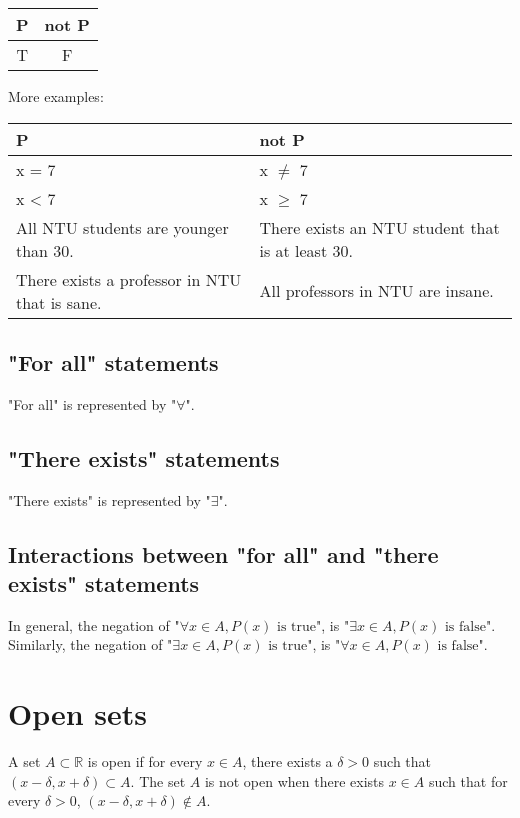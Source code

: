 \documentclass[11pt]{article}
\begin{document}
\begin{center}
\begin{tabular}{ |c|c| }
\hline
P & not P \\
\hline
T & F \\
\hline
\end{tabular}
\end{center}




More examples:

\begin{flushleft}
\begin{tabular}{ | m{15em} | m{15em} | }
\hline
P & not P \\
\hline
x = 7 & x $\neq$ 7 \\
\hline
x < 7 & x $\ge$ 7 \\
\hline
All NTU students are younger than 30. & There exists an NTU student that is at least 30. \\
\hline
There exists a professor in NTU that is sane. & All professors in NTU are insane. \\
\hline
\end{tabular}
\end{flushleft}

\subsection{"For all" statements}
\label{sec:orgfbca6e2}
"For all" is represented by "\(\forall\)".

\subsection{"There exists" statements}
\label{sec:org431e11d}
"There exists" is represented by "\(\exists\)".

\subsection{Interactions between "for all" and "there exists" statements}
\label{sec:org640407b}
In general, the negation of "\(\forall x \in A, P(x) \text{ is true}\)", is "\(\exists x \in A, P(x) \text{ is false}\)". Similarly, the negation of "\(\exists x \in A, P(x) \text{ is true}\)", is "\(\forall x \in A, P(x) \text{ is false}\)".


\section{Open sets}
\label{sec:orga7c46eb}
A set \(A \subset \mathbb{R}\) is open if for every \(x \in A\), there exists a \(\delta > 0\) such that \((x - \delta, x + \delta) \subset A\). The set \(A\) is not open when there exists \(x \in A\) such that for every \(\delta > 0\), \((x - \delta, x + \delta) \notin A\).
\\[0pt]
\end{document}

